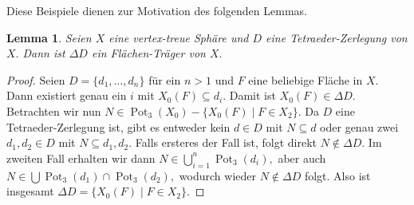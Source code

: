 \documentclass[12pt,titlepage,twoside,cleardoublepage]{article}
\theoremstyle{nummermitklammern}
\newtheorem{lemma}[temp]{Lemma}
\newtheorem{lemma}[zahl]{Lemma}
\numberwithin{equation}{section}
\DeclareMathOperator{\Pot}{Pot}
\begin{document}
Diese Beispiele dienen zur Motivation des folgenden Lemmas.
\begin{lemma}
Seien $X$ eine vertex-treue Sphäre und $D$ eine Tetraeder-Zerlegung von $X.$ Dann ist $\Delta D$ ein Flächen-Träger von $X.$
\end{lemma}
\begin{proof}
Seien $D=\{d_1,\ldots,d_n\}$ für ein $n>1$
und $F$ eine beliebige Fläche in $X.$ Dann existiert genau ein $i$ mit $X_0(F)\subseteq d_i.$ Damit ist $X_0(F) \in \Delta D.$ Betrachten wir nun $N\in \Pot_3(X_0)-\{X_0(F)\mid F\in X_2\}.$ Da $D$ eine Tetraeder-Zerlegung ist, gibt es entweder kein $d\in D$ mit $N\subseteq d$ oder genau zwei $d_1,d_2\in D$ mit $N\subseteq d_1,d_2.$ Falls ersteres der Fall ist, folgt direkt $N\notin \Delta D.$ Im zweiten Fall erhalten wir dann $N\in \bigcup_{i=1}^n \Pot_3(d_i),$ aber auch $N\in \bigcup \Pot_3(d_1)\cap \Pot_3(d_2),$ wodurch wieder $N\notin \Delta D$ folgt. 
Also ist insgesamt $\Delta D=\{X_0(F)\mid F\in X_2\}.$ 
\end{proof}
\end{document}
